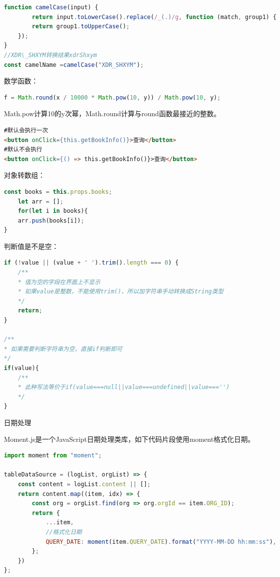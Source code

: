 \documentclass[12pt]{book}
\makeatletter
\numberwithin{dummy}{section}
\theoremstyle{ocrenumbox}
\theoremstyle{blacknumex}
\theoremstyle{blacknumbox}
\theoremstyle{ocrenum}
\renewcommand{\subsection}{\@startsection {subsection}{2}{\z@}
	{-3ex \@plus -0.1ex \@minus -.4ex}
	{0.5ex \@plus.2ex }
	{\normalfont\sffamily\bfseries}}
\makeatother
\begin{document}
\begin{lstlisting}[language=Javascript]
function camelCase(input) {
		return input.toLowerCase().replace(/_(.)/g, function (match, group1) {
		return group1.toUpperCase();
	});
}
//XDR\_SHXYM转换结果xdrShxym
const camelName =camelCase("XDR_SHXYM");
\end{lstlisting}

数学函数：

\begin{lstlisting}[language=Javascript]
f = Math.round(x / 10000 * Math.pow(10, y)) / Math.pow(10, y);
\end{lstlisting}

Math.pow计算10的y次幂，Math.round计算与round函数最接近的整数。

\begin{lstlisting}[language=HTML]
#默认会执行一次
<button onClick={this.getBookInfo()}>查询</button>
#默认不会执行
<button onClick={() => this.getBookInfo()}>查询</button>
\end{lstlisting}

对象转数组：

\begin{lstlisting}[language=Javascript]
const books = this.props.books;
	let arr = [];
	for(let i in books){
	arr.push(books[i]);
}
\end{lstlisting}

判断值是不是空：

\begin{lstlisting}[language=Javascript]
if (!value || (value + ' ').trim().length === 0) {
	/**
	* 值为空的字段在界面上不显示
	* 如果value是整数，不能使用trim()，所以加字符串手动转换成String类型
	*/
	return;
}

/**
* 如果需要判断字符串为空，直接if判断即可
*/
if(value){
	/**
	* 此种写法等价于if(value===null||value===undefined||value==='')
	*/
}
\end{lstlisting}

\subsection{日期处理}

Moment.js是一个JavaScript日期处理类库，如下代码片段使用moment格式化日期。

\begin{lstlisting}[language=Javascript]
import moment from "moment";

tableDataSource = (logList, orgList) => {
	const content = logList.content || [];
	return content.map((item, idx) => {
		const org = orgList.find(org => org.orgId == item.ORG_ID);
		return {
			...item,
			//格式化日期
			QUERY_DATE: moment(item.QUERY_DATE).format("YYYY-MM-DD hh:mm:ss"),
		};
	})
};
\end{lstlisting}
\end{document}
